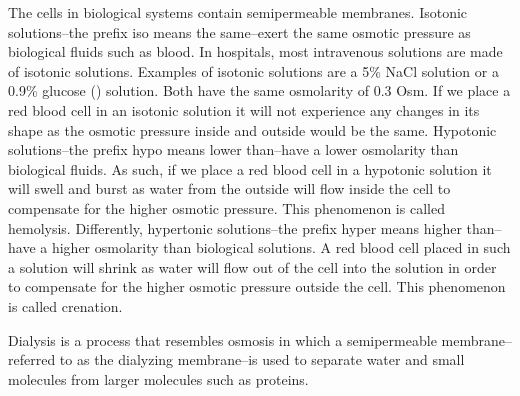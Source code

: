 \documentclass[main.tex]{subfiles}
\newcommand\chapterlabel{Ch-solutions}\setcounter{figurenewcounter}{0}\setcounter{tablenewcounter}{0}\setcounter{formulanewcounter}{0}
\begin{document}
\begin{description}
\begin{fullwidth}
\begin{minipage}[b]{1.1\linewidth}
{}\end{minipage}  \end{fullwidth}


 
\item[\docfilehook{Isotonic, hypotonic and hypertonic solutions}{}] 
The cells in biological systems contain semipermeable membranes. Isotonic solutions--the prefix iso means the same--exert the same osmotic pressure as biological fluids such as blood. In hospitals, most intravenous solutions are made of isotonic solutions. Examples of isotonic solutions are a 5\% NaCl solution or a 0.9\% glucose () solution. Both have the same osmolarity of 0.3 Osm. If we place a red blood cell in an isotonic solution it will not experience any changes in its shape as the osmotic pressure inside and outside would be the same. 
Hypotonic solutions--the prefix hypo means lower than--have a lower osmolarity than biological fluids. As such, if we place a red blood cell in a hypotonic solution it will swell and burst as water from the outside will flow inside the cell to compensate for the higher osmotic pressure. This phenomenon is called hemolysis. Differently, hypertonic solutions--the prefix hyper means higher than--have a higher osmolarity than biological solutions. A red blood cell placed in such a solution will shrink as water will flow out of the cell into the solution in order to compensate for the higher osmotic pressure outside the cell. This phenomenon is called crenation.
\item[\docfilehook{Dialisis}{}] 
Dialysis is a process that resembles osmosis in which a semipermeable membrane--referred to as the dialyzing membrane--is used to separate water and small molecules from larger molecules such as proteins.


\end{description}
\end{document}
